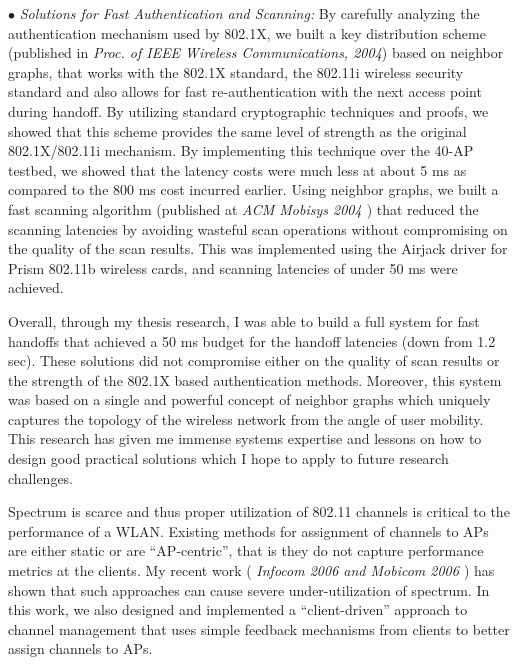 \documentclass[11pt,letterpaper]{article}
\begin{document}
$\bullet$  {\it Solutions for Fast Authentication and Scanning:} By carefully analyzing the authentication
mechanism used by 802.1X, we built a key distribution scheme (published in {\it Proc. of IEEE Wireless Communications,
2004}) based on neighbor graphs, that works with the 802.1X
standard, the 802.11i wireless security standard and also allows for fast re-authentication with the next access point
during handoff. By utilizing standard cryptographic techniques and proofs, we showed that this scheme provides the same
level of strength as the original 802.1X/802.11i mechanism. By implementing this technique over the 40-AP testbed, we 
showed that the latency costs were much less at about 5 ms as compared to the 800 ms cost incurred earlier.  
Using neighbor graphs, we built a fast scanning algorithm (published at {\it ACM Mobisys
2004 \cite{shin2004}}) that reduced the scanning latencies by avoiding wasteful scan operations without compromising on the quality of
the scan results. This was implemented using the Airjack driver for Prism  802.11b wireless cards, and scanning
latencies of under 50 ms were achieved. 

Overall, through my thesis research, I was able to build a full system for fast handoffs that achieved a 50 ms budget
for the handoff latencies (down from 1.2 sec). These solutions did not compromise either on the quality of scan results
or the strength of the 802.1X based authentication methods. Moreover, this system was based on a single and powerful
concept of neighbor graphs which uniquely captures the topology of the wireless network from the angle of user mobility.
This research has given me immense systems expertise and lessons on how to design good practical solutions which I hope
to apply to future research challenges.



 Spectrum is scarce and thus proper utilization of
802.11 channels is critical to the performance of a WLAN. Existing methods for assignment of channels to APs are either
static or are ``AP-centric'', that is they do not capture performance metrics at the clients. My recent work ({\it
Infocom 2006 \cite{infocom2006,graph2005} and Mobicom 2006 \cite{mobicom2006}}) has shown that such approaches can cause severe under-utilization of spectrum. In this
work, we also designed and implemented a ``client-driven'' approach to channel management  that uses simple feedback
mechanisms from clients to better assign channels to APs.
\end{document}
